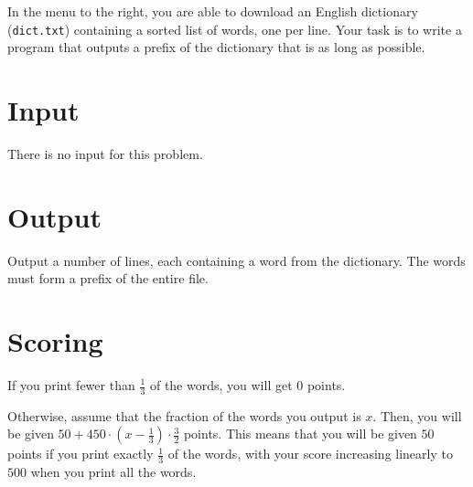 In the menu to the right, you are able to download an English dictionary (\texttt{dict.txt}) containing a sorted list of words, one per line.
Your task is to write a program that outputs a prefix of the dictionary that is as long as possible.

\section*{Input}
There is no input for this problem.

\section*{Output}
Output a number of lines, each containing a word from the dictionary.
The words must form a prefix of the entire file.

\section*{Scoring}
If you print fewer than $\frac{1}{3}$ of the words, you will get 0 points.

Otherwise, assume that the fraction of the words you output is $x$. Then, you will be given $50 + 450 \cdot (x - \frac{1}{3}) \cdot \frac{3}{2}$ points.
This means that you will be given $50$ points if you print exactly $\frac{1}{3}$ of the words, with your score increasing linearly to $500$ when you print all the words.
